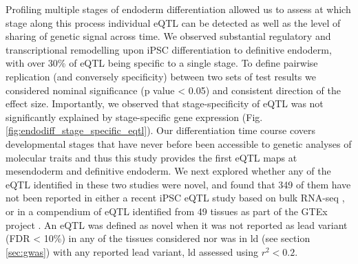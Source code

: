 Profiling multiple stages of endoderm differentiation allowed us to assess at which stage along this process individual eQTL can be detected as well as the level of sharing of genetic signal across time. 
We observed substantial regulatory and transcriptional remodelling upon iPSC differentiation to definitive endoderm, with over 30\% of eQTL being specific to a single stage.
To define pairwise replication (and conversely specificity) between two sets of test results we considered nominal significance (p value < 0.05) and consistent direction of the effect size.
Importantly, we observed that stage-specificity of eQTL was not significantly explained by stage-specific gene expression (Fig. \ref{fig:endodiff_stage_specific_eqtl}).
Our differentiation time course covers developmental stages that have never before been accessible to genetic analyses of molecular traits and thus this study provides the first eQTL maps at mesendoderm and definitive endoderm.
We next explored whether any of the eQTL identified in these two studies were novel, and found that 349 of them have not been reported in either a recent iPSC eQTL study based on bulk RNA-seq \cite{mirauta2018population}, or in a compendium of eQTL identified from 49 tissues as part of the GTEx project \cite{gtex2017genetic}.
An eQTL was defined as novel when it was not reported as lead variant (FDR < 10\%) in any of the tissues considered nor was in \gls{ld} (see section \ref{sec:gwas}) with any reported lead variant, \gls{ld} assessed using $r^2<0.2$.\\

